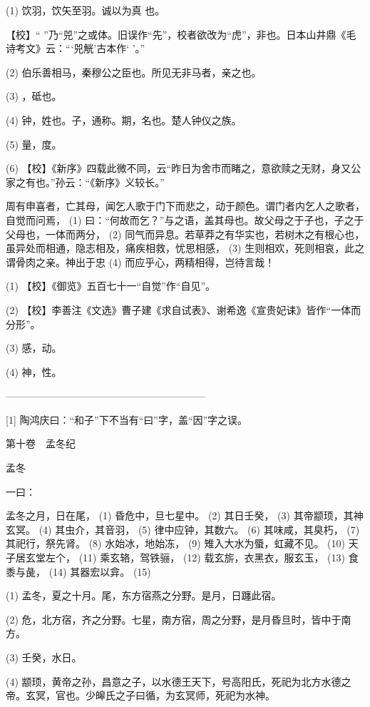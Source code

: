 \documentclass[12pt,UTF8]{ctexbook}
\begin{document}
(1) 饮羽，饮矢至羽。诚以为真 也。

【校】“ ”乃“兕”之或体。旧误作“先”，校者欲改为“虎”，非也。日本山井鼎《毛诗考文》云：“‘兕觥’古本作‘ ’。”

(2) 伯乐善相马，秦穆公之臣也。所见无非马者，亲之也。

(3) ，砥也。

(4) 钟，姓也。子，通称。期，名也。楚人钟仪之族。

(5) 量，度。

(6) 【校】《新序》四载此微不同，云“昨日为舍市而睹之，意欲赎之无财，身又公家之有也。”孙云：“《新序》义较长。”

周有申喜者，亡其母，闻乞人歌于门下而悲之，动于颜色。谓门者内乞人之歌者，自觉而问焉， (1) 曰：“何故而乞？”与之语，盖其母也。故父母之于子也，子之于父母也，一体而两分， (2) 同气而异息。若草莽之有华实也，若树木之有根心也，虽异处而相通，隐志相及，痛疾相救，忧思相感， (3) 生则相欢，死则相哀，此之谓骨肉之亲。神出于忠 (4) 而应乎心，两精相得，岂待言哉！

(1) 【校】《御览》五百七十一“自觉”作“自见”。

(2) 【校】李善注《文选》曹子建《求自试表》、谢希逸《宣贵妃诔》皆作“一体而分形”。

(3) 感，动。

(4) 神，性。




————————————————————

[1] 陶鸿庆曰：“和子”下不当有“曰”字，盖“因”字之误。





第十卷　孟冬纪



孟冬


一曰：

孟冬之月，日在尾， (1) 昏危中，旦七星中。 (2) 其日壬癸， (3) 其帝颛顼，其神玄冥。 (4) 其虫介，其音羽， (5) 律中应钟，其数六。 (6) 其味咸，其臭朽， (7) 其祀行，祭先肾。 (8) 水始冰，地始冻， (9) 雉入大水为蜃，虹藏不见。 (10) 天子居玄堂左个， (11) 乘玄辂，驾铁骊， (12) 载玄旂，衣黑衣，服玄玉， (13) 食黍与彘， (14) 其器宏以弇。 (15)

(1) 孟冬，夏之十月。尾，东方宿燕之分野。是月，日躔此宿。

(2) 危，北方宿，齐之分野。七星，南方宿，周之分野，是月昏旦时，皆中于南方。

(3) 壬癸，水日。

(4) 颛顼，黄帝之孙，昌意之子，以水德王天下，号高阳氏，死祀为北方水德之帝。玄冥，官也。少皞氏之子曰循，为玄冥师，死祀为水神。
\end{document}
